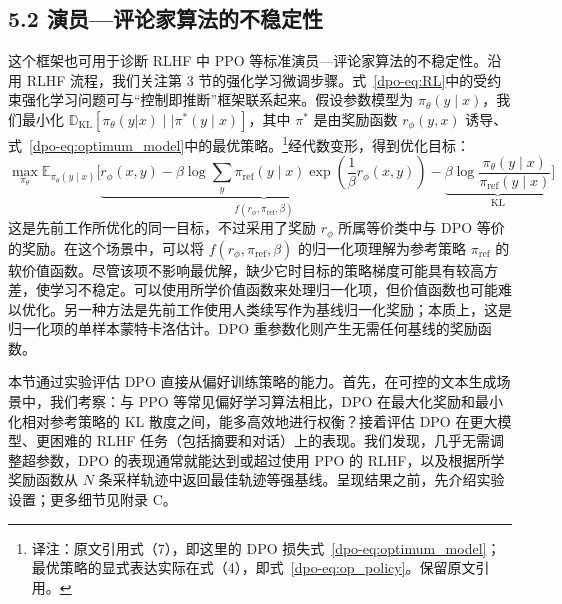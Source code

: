 \subsection*{5.2 演员—评论家算法的不稳定性}
这个框架也可用于诊断 RLHF 中 PPO 等标准演员—评论家算法的不稳定性。沿用 RLHF 流程，我们关注第 3 节的强化学习微调步骤。式~\ref{dpo-eq:RL}中的受约束强化学习问题可与“控制即推断”框架\cite{dpo-levine2018reinforcement}联系起来。假设参数模型为 $\pi_\theta(y\mid x)$，我们最小化 $\mathbb D_\text{KL}[\pi_\theta(y|x)\mid\mid\pi^*(y\mid x)]$，其中 $\pi^*$ 是由奖励函数 $r_\phi(y,x)$ 诱导、式~\ref{dpo-eq:optimum_model}中的最优策略。\footnote{译注：原文引用式（7），即这里的 DPO 损失式~\ref{dpo-eq:optimum_model}；最优策略的显式表达实际在式（4），即式~\ref{dpo-eq:op_policy}。保留原文引用。}经代数变形，得到优化目标：
\begin{equation}\label{dpo-eq:AC}
    \max_{\pi_{\theta}}\mathbb{E}_{\pi_{\theta}(y\mid x)}\bigg[\underbrace{r_{\phi}(x, y) -\beta\log\sum_{y}\pi_{\mathrm{ref}}(y\mid x)\exp\left(\frac{1}{\beta}r_{\phi}(x, y)\right)}_{f(r_{\phi}, \pi_{\mathrm{ref}}, \beta)} - \underbrace{\beta\log\frac{\pi_{\theta}(y\mid x)}{\pi_{\mathrm{ref}}(y\mid x)}}_{\text{KL}}\bigg]
\end{equation}
这是先前工作\cite{dpo-ziegler2020finetuning,dpo-stiennon2022learning,dpo-bai2022training,dpo-ouyang2022training}所优化的同一目标，不过采用了奖励 $r_\phi$ 所属等价类中与 DPO 等价的奖励。在这个场景中，可以将 $f(r_\phi,\pi_{\mathrm{ref}},\beta)$ 的归一化项理解为参考策略 $\pi_{\mathrm{ref}}$ 的软价值函数。尽管该项不影响最优解，缺少它时目标的策略梯度可能具有较高方差，使学习不稳定。可以使用所学价值函数来处理归一化项，但价值函数也可能难以优化。另一种方法是先前工作使用人类续写作为基线归一化奖励；本质上，这是归一化项的单样本蒙特卡洛估计。DPO 重参数化则产生无需任何基线的奖励函数。


本节通过实验评估 DPO 直接从偏好训练策略的能力。首先，在可控的文本生成场景中，我们考察：与 PPO 等常见偏好学习算法相比，DPO 在最大化奖励和最小化相对参考策略的 KL 散度之间，能多高效地进行权衡？接着评估 DPO 在更大模型、更困难的 RLHF 任务（包括摘要和对话）上的表现。我们发现，几乎无需调整超参数，DPO 的表现通常就能达到或超过使用 PPO 的 RLHF，以及根据所学奖励函数从 $N$ 条采样轨迹中返回最佳轨迹等强基线。呈现结果之前，先介绍实验设置；更多细节见附录 C。


